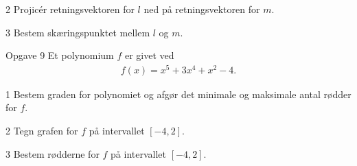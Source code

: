 \begin{delopgave}{}{2}
	Projicér retningsvektoren for $l$ ned på retningsvektoren for $m$.  
\end{delopgave}
\begin{delopgave}{}{3}
	Bestem skæringspunktet mellem $l$ og $m$.
\end{delopgave}
\begin{opgavetekst}{Opgave 9}
	Et polynomium $f$ er givet ved
	\begin{align*}
		f(x) = x^5+3x^4+x^2-4.
	\end{align*}
\end{opgavetekst}
\begin{delopgave}{}{1}
	Bestem graden for polynomiet og afgør det minimale og maksimale antal rødder for $f$. 
\end{delopgave}
\begin{delopgave}{}{2}
	Tegn grafen for $f$ på intervallet $[-4,2]$.
\end{delopgave}
\begin{delopgave}{}{3}
	Bestem rødderne for $f$ på intervallet $[-4,2]$.
\end{delopgave}

